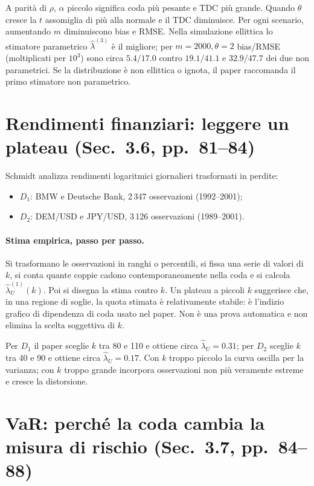 \documentclass[11pt,a4paper]{article}
\begin{document}
A parità di $\rho$, $\alpha$ piccolo significa coda più pesante e TDC più
grande. Quando $\theta$ cresce la $t$ assomiglia di più alla normale e il TDC
diminuisce. Per ogni scenario, aumentando $m$ diminuiscono bias e RMSE. Nella
simulazione ellittica lo stimatore parametrico $\widehat\lambda^{(3)}$ è il
migliore; per $m=2000,\theta=2$ bias/RMSE (moltiplicati per $10^3$) sono circa
$5.4/17.0$ contro $19.1/41.1$ e $32.9/47.7$ dei due non parametrici. Se la
distribuzione è non ellittica o ignota, il paper raccomanda il primo stimatore
non parametrico.

\section{Rendimenti finanziari: leggere un plateau (Sec.~3.6, pp.~81--84)}

Schmidt analizza rendimenti logaritmici giornalieri trasformati in perdite:
\begin{itemize}[nosep]
  \item $D_1$: BMW e Deutsche Bank, 2\,347 osservazioni (1992--2001);
  \item $D_2$: DEM/USD e JPY/USD, 3\,126 osservazioni (1989--2001).
\end{itemize}

\paragraph{Stima empirica, passo per passo.}
Si trasformano le osservazioni in ranghi o percentili, si fissa una serie di
valori di $k$, si conta quante coppie cadono contemporaneamente nella coda e
si calcola $\widehat\lambda_U^{(1)}(k)$. Poi si disegna la stima contro $k$.
Un plateau a piccoli $k$ suggerisce che, in una regione di soglie, la quota
stimata è relativamente stabile: è l'indizio grafico di dipendenza di coda
usato nel paper. Non è una prova automatica e non elimina la scelta soggettiva
di $k$.

Per $D_1$ il paper sceglie $k$ tra 80 e 110 e ottiene circa
$\widehat\lambda_U=0.31$; per $D_2$ sceglie $k$ tra 40 e 90 e ottiene circa
$\widehat\lambda_U=0.17$. Con $k$ troppo piccolo la curva oscilla per la
varianza; con $k$ troppo grande incorpora osservazioni non più veramente
estreme e cresce la distorsione.

\section{VaR: perché la coda cambia la misura di rischio (Sec.~3.7, pp.~84--88)}
\end{document}
